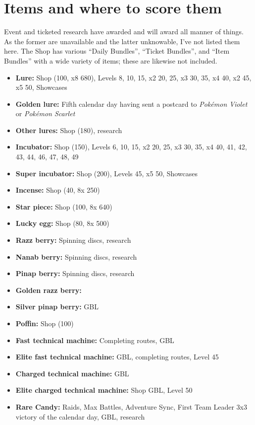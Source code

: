 \section{Items and where to score them\label{sec:items}}
Event and ticketed research have awarded and will award all manner of things.
As the former are unavailable and the latter unknowable, I've not listed them here.
The Shop has various ``Daily Bundles'', ``Ticket Bundles'', and ``Item Bundles'' with
 a wide variety of items; these are likewise not included.
\begin{itemize}
\item \textbf{Lure:} Shop (100\coin, x8 680\coin), Levels 8, 10, 15, x2 20, 25, x3 30, 35, x4 40, x2 45, x5 50, Showcases
\item \textbf{Golden lure:} Fifth calendar day having sent a postcard to \textit{Pokémon Violet} or \textit{Pokémon Scarlet}
\item \textbf{Other lures:} Shop (180\coin), research
\item \textbf{Incubator:} Shop (150\coin), Levels 6, 10, 15, x2 20, 25, x3 30, 35, x4 40, 41, 42, 43, 44, 46, 47, 48, 49
\item \textbf{Super incubator:} Shop (200\coin), Levels 45, x5 50, Showcases
\item \textbf{Incense:} Shop (40\coin, 8x 250\coin)
\item \textbf{Star piece:} Shop (100\coin, 8x 640\coin)
\item \textbf{Lucky egg:} Shop (80\coin, 8x 500\coin)
\item \textbf{Razz berry:} Spinning discs, research
\item \textbf{Nanab berry:} Spinning discs, research
\item \textbf{Pinap berry:} Spinning discs, research
\item \textbf{Golden razz berry:}
\item \textbf{Silver pinap berry:} GBL
\item \textbf{Poffin:} Shop (100\coin)
\item \textbf{Fast technical machine:} Completing routes, GBL
\item \textbf{Elite fast technical machine:} GBL, completing routes, Level 45
\item \textbf{Charged technical machine:} GBL
\item \textbf{Elite charged technical machine:} Shop GBL, Level 50
\item \textbf{Rare Candy:} Raids, Max Battles, Adventure Sync, First Team Leader 3x3 victory of the calendar day, GBL, research

\end{itemize}
